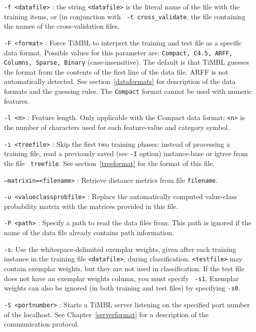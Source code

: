 \documentclass{report}
\begin{document}
\begin{description}

\item {\tt -f <datafile>} : the string {\tt <datafile>} is the literal
name of the file with the training items, or (in conjunction with {\tt
-t cross\_validate}, the file containing the names of the
cross-validation files.

\item {\tt -F <format>} : Force TiMBL to interpret the training and
test file as a specific data format. Possible values for this
parameter are: {\tt Compact, C4.5, ARFF, Columns, Sparse, Binary}
(case-insensitive). The default is that TiMBL guesses the format from
the contents of the first line of the data file. ARFF is not
automatically detected. See section~\ref{dataformats} for description
of the data formats and the guessing rules. The {\tt Compact} format
cannot be used with numeric features.

\item {\tt -l <n>} : Feature length. Only applicable with the Compact
  data format; {\tt <n>} is the number of characters used for each
  feature-value and category symbol.

\item {\tt -i <treefile>} : Skip the first two training phases:
  instead of processing a training file, read a previously saved (see
  {\tt -I} option) instance-base or {\sc igtree} from the file {\tt
    treefile}. See section~\ref{treeformat} for the format of this
  file.

\item {\tt --matrixin=<filename>} : Retrieve distance metrics from file 
{\tt filename}.

\item {\tt -u <valueclassprobfile>} : Replace the automatically
  computed value-class probability matrix with the matrices provided
  in this file.

\item {\tt -P <path>} : Specify a path to read the data files
  from. This path is ignored if the name of the data file already
  contains path information.

\item {\tt -s}: Use the whitespace-delimited exemplar weights, given
  after each training instance in the training file {\tt <datafile>},
  during classification. {\tt <testfile>} may contain exemplar
  weights, but they are not used in classification. If the test file
  does not have an exemplar weights column, you must specify {\tt
    -s1}. Exemplar weights can also be ignored (in both training and
  test files) by specifying {\tt -s0}.

\item {\tt -S <portnumber>} : Starts a TiMBL server listening on the
  specified port number of the localhost. See
  Chapter~\ref{serverformat} for a description of the communication
  protocol.

\end{description}
\end{document}
